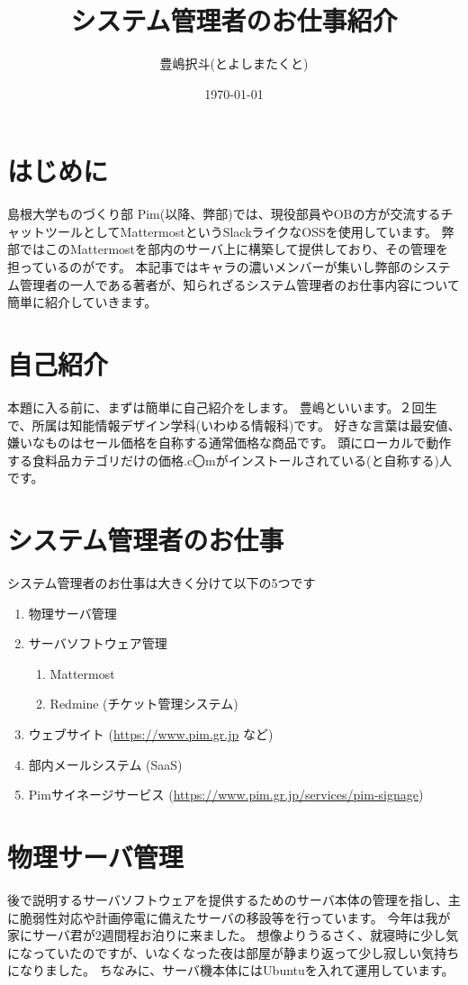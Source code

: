 \documentclass[a4paper,11pt]{jsarticle}
\begin{document}
\title{システム管理者のお仕事紹介}
\author{豊嶋択斗(とよしまたくと)}
\date{\today}
\maketitle

\section{はじめに}
島根大学ものづくり部 Pim(以降、弊部)では、現役部員やOBの方が交流するチャットツールとしてMattermostというSlackライクなOSSを使用しています。
弊部ではこのMattermostを部内のサーバ上に構築して提供しており、その管理を担っているのがです。
本記事ではキャラの濃いメンバーが集いし弊部のシステム管理者の一人である著者が、知られざるシステム管理者のお仕事内容について簡単に紹介していきます。

\section{自己紹介}
本題に入る前に、まずは簡単に自己紹介をします。
豊嶋といいます。２回生で、所属は知能情報デザイン学科(いわゆる情報科)です。
好きな言葉は最安値、嫌いなものはセール価格を自称する通常価格な商品です。
頭にローカルで動作する食料品カテゴリだけの価格.c〇mがインストールされている(と自称する)人です。

\section{システム管理者のお仕事}
システム管理者のお仕事は大きく分けて以下の5つです
\begin{enumerate}
  \item 物理サーバ管理
  \item サーバソフトウェア管理
    \begin{enumerate}
      \item Mattermost
      \item Redmine (チケット管理システム)
    \end{enumerate}
  \item ウェブサイト (\url{https://www.pim.gr.jp} など)
  \item 部内メールシステム (SaaS)
  \item Pimサイネージサービス (\url{https://www.pim.gr.jp/services/pim-signage})
\end{enumerate}

\section{物理サーバ管理}
後で説明するサーバソフトウェアを提供するためのサーバ本体の管理を指し、主に脆弱性対応や計画停電に備えたサーバの移設等を行っています。
今年は我が家にサーバ君が2週間程お泊りに来ました。
想像よりうるさく、就寝時に少し気になっていたのですが、いなくなった夜は部屋が静まり返って少し寂しい気持ちになりました。
ちなみに、サーバ機本体にはUbuntuを入れて運用しています。
\end{document}
